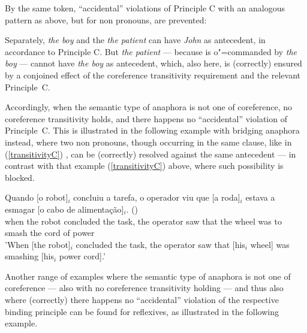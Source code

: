 \documentclass[output=paper
,modfonts
,nonflat]{langsci/langscibook}
\begin{document}
By the same token, ``accidental'' violations of Principle C 
with an analogous pattern as above, but for non pronouns, are prevented:

 \begin{exe}
\label{transitivityC}
\end{exe}

Separately, {\em the boy} and the {\em the patient} can have {\em John} as antecedent, in accordance
to Principle C. 
But {\em the patient} --- because is o"=commanded by {\em the boy} --- cannot have {\em the boy} as antecedent, 
which, also here, is (correctly) ensured by a conjoined 
effect of the coreference transitivity requirement and the relevant Principle~C.

Accordingly, when the semantic type of anaphora is not one of coreference,
no coreference transitivity holds, and there happens no ``accidental'' violation of Principle~C.
This is illustrated in the following example with bridging anaphora instead,
where two non pronouns, though occurring in the same clause, like in (\ref{transitivityC}) , can be (correctly) resolved against 
the same antecedent --- in contrast with that example (\ref{transitivityC}) above, where such possibility is blocked.

\begin{exe}
\ex
\gll Quando [o robot]$_{i}$ concluiu a tarefa, o operador viu que [a roda]$_{i}$ estava a esmagar [o cabo de alimenta\c{c}\~ao]$_{i}$. ()\\ 
when the robot concluded the task, the operator saw that the wheel was to smash the cord of power\\
\trans 'When [the robot]$_{i}$ concluded the task, the operator saw that [his$_{i}$ wheel] was smashing [his$_{i}$ power cord].'
\end{exe}

Another range of examples where the semantic type of anaphora is not one of coreference --- also with
no coreference transitivity holding --- and thus also where (correctly) there happens no ``accidental'' violation
of the respective binding principle can be found for reflexives, as illustrated in the following example.

 \begin{exe}
 \label{accidentalReflexives}
\end{exe}
\end{document}
